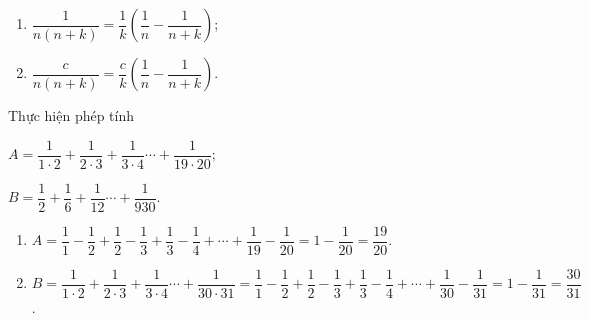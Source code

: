\begin{dang}
	\begin{enumerate}[\tickEX]
		\item $\dfrac{1}{n(n+k)}= \dfrac{1}{k} \left( \dfrac{1}{n} - \dfrac{1}{n+k}\right) $;
		\item $\dfrac{c}{n(n+k)}= \dfrac{c}{k} \left( \dfrac{1}{n} - \dfrac{1}{n+k}\right) $.
	\end{enumerate}
\end{dang}

\begin{vd}
	Thực hiện phép tính
	\begin{listEX}[2]
		\item $A= \dfrac{1}{1 \cdot 2}+ \dfrac{1}{2 \cdot 3} + \dfrac{1}{ 3 \cdot 4} \cdots + \dfrac{1}{19 \cdot 20}$;
		\item $B= \dfrac{1}{ 2}+ \dfrac{1}{6} + \dfrac{1}{12} \cdots + \dfrac{1}{930}$.
	\end{listEX}
	\loigiai
	{\begin{enumerate}
			\item $A= \dfrac{1}{1}- \dfrac{1}{2} + \dfrac{1}{2}-\dfrac{1}{3}+\dfrac{1}{3} -\dfrac{1}{4}+ \cdots + \dfrac{1}{19}- \dfrac{1}{20} = 1 - \dfrac{1}{20} = \dfrac{19}{20}$.
			\item $B=\dfrac{1}{1 \cdot 2}+ \dfrac{1}{2 \cdot 3} + \dfrac{1}{ 3 \cdot 4} \cdots + \dfrac{1}{30 \cdot 31} =  \dfrac{1}{1}- \dfrac{1}{2} + \dfrac{1}{2}-\dfrac{1}{3}+\dfrac{1}{3} -\dfrac{1}{4}+ \cdots + \dfrac{1}{30}- \dfrac{1}{31} = 1 - \dfrac{1}{31} = \dfrac{30}{31}$.
		\end{enumerate}
	}
\end{vd}

